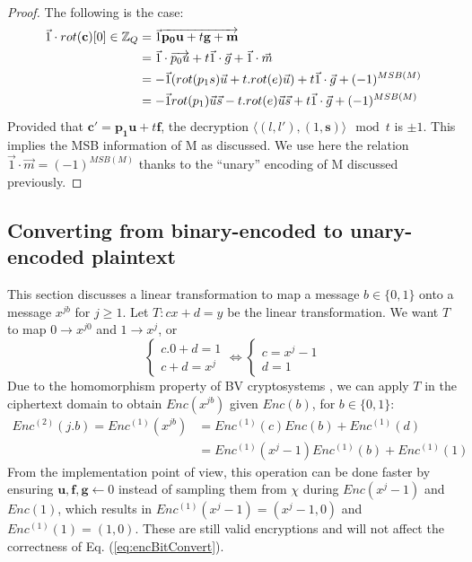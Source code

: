 \begin{proof}
	The following is the case:\\
	\begin{align*}
	\vec{1} \cdot rot(\mathbf{c})[0] \in \mathbb{Z}_Q &= \vec{1}\overrightarrow{
		\mathbf{p_0}\mathbf{u} + t\mathbf{g} + \mathbf{m}}\\
	&= \vec{1}\cdot\overrightarrow{p_0u} +t\vec{1}\cdot\vec{g} +\vec{1}\cdot\vec{m}\\
	&= -\vec{1}(rot(p_1s)\vec{u} +t.rot(e)\vec{u}) + t\vec{1}\cdot\vec{g} + (-1)^{MSB(M)}\\
	&= -\vec{1}rot(p_1)\vec{u}\vec{s} - t.rot(e)\vec{u}\vec{s} + t\vec{1}\cdot\vec{g} + (-1)^{MSB(M)}\\
	\end{align*}
	Provided that $\mathbf{c'} = \mathbf{p_1}\mathbf{u} + t\mathbf{f}$, the decryption $\langle(l,l'),(1,\mathbf{s})\rangle \mod t$ is $\pm1$.
	This implies the MSB information of M as discussed. We use here the relation $\vec{1}\cdot \vec{m} = (-1)^{MSB(M)}$ thanks to the ``unary'' encoding of M discussed previously.
\end{proof}

\subsection{Converting from binary-encoded to unary-encoded plaintext}
\label{sec:binToUna}
This section discusses a linear transformation to map a message $b \in \{0,1\}$
onto a message $x^{jb}$ for $j \geq 1$. Let $T: cx + d = y$ be the linear transformation. We want $T$ to map $0 \rightarrow x^{j0} $ and
$1 \rightarrow x^j$, or
\[
  \begin{cases}
    c.0 + d = 1\\
    c + d = x^j
  \end{cases}
  \Leftrightarrow
  \begin{cases}
    c = x^j - 1\\
    d = 1
  \end{cases}
\]
Due to the homomorphism property of BV cryptosystems , we can apply
$T$ in the ciphertext domain to obtain $Enc(x^{jb})$ given $Enc(b)$,
for $b \in \{0,1\}$:
\begin{align}
  \label{eq:encBitConvert}
  Enc^{(2)}(j.b) = Enc^{(1)}(x^{jb}) &= Enc^{(1)}(c)Enc(b) + Enc^{(1)}(d) \nonumber \\
              &= Enc^{(1)}(x^j - 1)Enc^{(1)}(b) + Enc^{(1)}(1)
\end{align}
From the implementation point of view, this operation can be done faster
by ensuring $\mathbf{u}, \mathbf{f}, \mathbf{g} \gets 0$ instead of sampling them from
$\chi$ during $Enc(x^j -1)$ and $Enc(1)$, which results in $Enc^{(1)}(x^j -1) = (x^j - 1, 0)$ and $Enc^{(1)}(1) = (1,0)$. These are still valid encryptions and will not affect the correctness of Eq. (\ref{eq:encBitConvert}).

